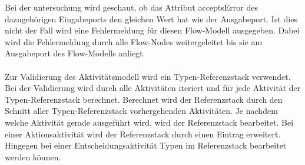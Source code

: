 \documentclass{article}
\begin{document}
    Bei der untersuchung wird geschaut, ob das Attribut acceptsError des dazugehörigen Eingabeports den gleichen Wert hat wie der Ausgabeport. 
    Ist dies nicht der Fall wird eine Fehlermeldung für diesen Flow-Modell ausgegeben. 
    Dabei wird die Fehlermeldung durch alle Flow-Nodes weitergeleitet bis sie am Ausgabeport des Flow-Modells anliegt.\\
    \\
    Zur Validierung des Aktivitätsmodell wird ein Typen-Referenzstack verwendet.
    Bei der Validierung wird durch alle Aktivitäten iteriert und für jede Aktivität der Typen-Referenzstack berechnet.
    Berechnet wird der Referenzstack durch den Schnitt aller Typen-Referenzstack vorhergehenden Aktivitäten.
    Je nachdem welche Aktivität gerade ausgeführt wird, wird der Referenzstack bearbeitet.
    Bei einer Aktionsaktivität wird der Referenzstack durch einen Eintrag erweitert.
    Hingegen bei einer Entscheidungsaktivität Typen im Referenzstack bearbeitet werden können.

\end{document}
